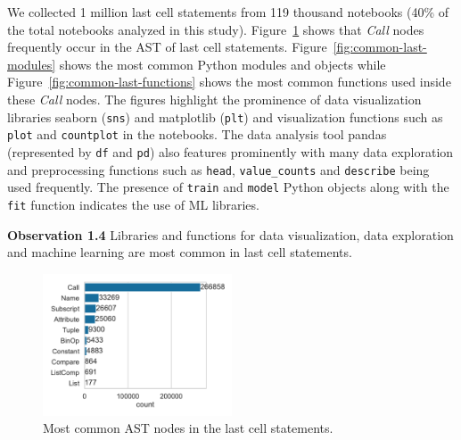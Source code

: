 \documentclass[smallextended]{svjour3}       %
\newcommand{\highlight}[1]{\begin{framed}%
  \noindent#1
\end{framed}}
\begin{document}
We collected 1 million last cell statements from 119 thousand notebooks (40\% of the total notebooks analyzed in this study). Figure~\ref{fig:common-last-nodes} shows that \emph{Call} nodes frequently occur in the AST of last cell statements. Figure~\ref{fig:common-last-modules} shows the most common Python modules and objects while Figure~\ref{fig:common-last-functions} shows the most common functions used inside these \emph{Call} nodes. The figures highlight the prominence of data visualization libraries seaborn (\lstinline{sns}) and matplotlib (\lstinline{plt}) and visualization functions such as \lstinline{plot} and \lstinline{countplot} in the notebooks. The data analysis tool pandas (represented by \lstinline{df} and \lstinline{pd}) also features prominently with many data exploration and preprocessing functions such as \lstinline{head}, \lstinline{value_counts} and \lstinline{describe} being used frequently. The presence of \lstinline{train} and \lstinline{model} Python objects along with the \lstinline{fit} function indicates the use of ML libraries.

\highlight{\textbf{Observation 1.4} Libraries and functions for data visualization, data exploration and machine learning are most common in last cell statements.}

\begin{figure}
	\centering
	\includegraphics[width=0.5\textwidth]{common-last-nodes.pdf}
	\caption{Most common AST nodes in the last cell statements.}
	\label{fig:common-last-nodes}
\end{figure}
\end{document}
